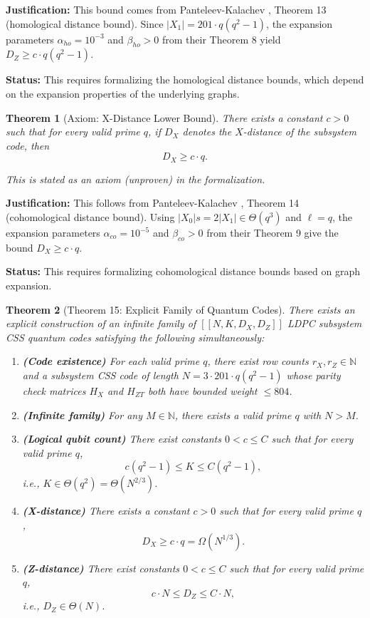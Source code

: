 \documentclass[11pt]{article}
\theoremstyle{plain}
\newtheorem*{theorem}{Theorem}
\theoremstyle{definition}
\theoremstyle{remark}
\begin{document}
\textbf{Justification:} This bound comes from Panteleev-Kalachev \cite{PK22}, Theorem 13 (homological distance bound). Since $|X_1| = 201 \cdot q(q^2-1)$, the expansion parameters $\alpha_{ho} = 10^{-3}$ and $\beta_{ho} > 0$ from their Theorem 8 yield $D_Z \geq c \cdot q(q^2-1)$.

\textbf{Status:} This requires formalizing the homological distance bounds, which depend on the expansion properties of the underlying graphs.

\begin{theorem}[Axiom: X-Distance Lower Bound]
There exists a constant $c > 0$ such that for every valid prime $q$, if $D_X$ denotes the $X$-distance of the subsystem code, then
\[
D_X \geq c \cdot q.
\]

\textit{This is stated as an axiom (unproven) in the formalization.}
\end{theorem}

\textbf{Justification:} This follows from Panteleev-Kalachev \cite{PK22}, Theorem 14 (cohomological distance bound). Using $|X_0|s = 2|X_1| \in \Theta(q^3)$ and $\ell = q$, the expansion parameters $\alpha_{co} = 10^{-5}$ and $\beta_{co} > 0$ from their Theorem 9 give the bound $D_X \geq c \cdot q$.

\textbf{Status:} This requires formalizing cohomological distance bounds based on graph expansion.

\begin{theorem}[Theorem 15: Explicit Family of Quantum Codes]
There exists an explicit construction of an infinite family of $[\![N, K, D_X, D_Z]\!]$ LDPC subsystem CSS quantum codes satisfying the following simultaneously:
\begin{enumerate}
  \item \textbf{(Code existence)} For each valid prime $q$, there exist row counts $r_X, r_Z \in \mathbb{N}$ and a subsystem CSS code of length $N = 3 \cdot 201 \cdot q(q^2-1)$ whose parity check matrices $H_X$ and $H_{ZT}$ both have bounded weight $\leq 804$.
  \item \textbf{(Infinite family)} For any $M \in \mathbb{N}$, there exists a valid prime $q$ with $N > M$.
  \item \textbf{(Logical qubit count)} There exist constants $0 < c \leq C$ such that for every valid prime $q$,
  \[
    c(q^2 - 1) \leq K \leq C(q^2 - 1),
  \]
  i.e., $K \in \Theta(q^2) = \Theta(N^{2/3})$.
  \item \textbf{(X-distance)} There exists a constant $c > 0$ such that for every valid prime $q$,
  \[
    D_X \geq c \cdot q = \Omega(N^{1/3}).
  \]
  \item \textbf{(Z-distance)} There exist constants $0 < c \leq C$ such that for every valid prime $q$,
  \[
    c \cdot N \leq D_Z \leq C \cdot N,
  \]
  i.e., $D_Z \in \Theta(N)$.
\end{enumerate}
\end{theorem}
\end{document}
